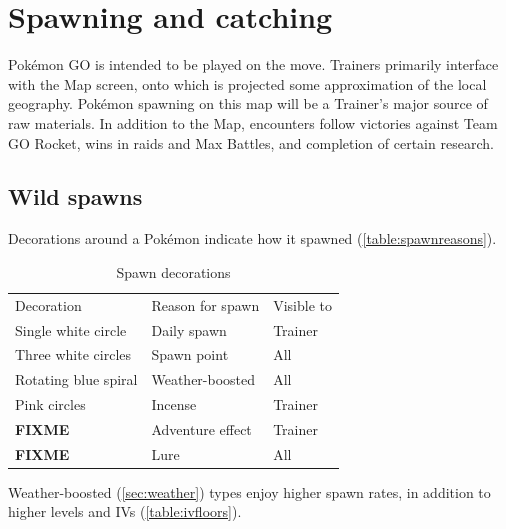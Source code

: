 \chapter{Spawning and catching}
\label{chap:spawn}
Pokémon GO is intended to be played on the move.
Trainers primarily interface with the Map screen, onto which is projected
  some approximation of the local geography.
Pokémon spawning on this map will be a Trainer's major source of raw materials.
In addition to the Map, encounters follow victories against Team GO Rocket,
  wins in raids and Max Battles, and completion of certain research.

\section{Wild spawns}
\label{sec:spawns}
Decorations around a Pokémon indicate how it spawned (\autoref{table:spawnreasons}).
\begin{table}[ht]
\centering
\begin{tabular}{lll}
  Decoration & Reason for spawn & Visible to\\
\Midrule
  Single white circle & Daily spawn & Trainer\\
  Three white circles & Spawn point & All\\
  Rotating blue spiral & Weather-boosted & All\\
  Pink circles & Incense & Trainer\\
  \textbf{FIXME} & Adventure effect & Trainer\\
  \textbf{FIXME} & Lure & All\\
\end{tabular}
\caption{Spawn decorations}
\label{table:spawnreasons}
\end{table}
Weather-boosted (\autoref{sec:weather}) types enjoy higher spawn rates,
  in addition to higher levels and IVs (\autoref{table:ivfloors}).

